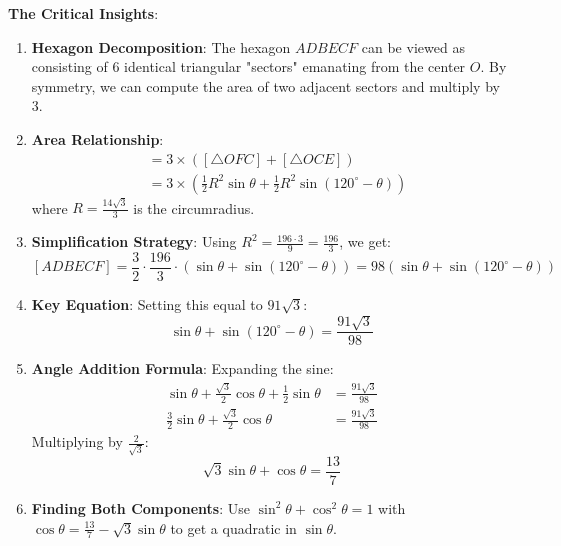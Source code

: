 \documentclass[12pt]{article}
\begin{document}
\begin{keyinsightbox}
\textbf{The Critical Insights}:

\begin{enumerate}
    \item \textbf{Hexagon Decomposition}: The hexagon $ADBECF$ can be viewed as consisting of 6 identical triangular "sectors" emanating from the center $O$. By symmetry, we can compute the area of two adjacent sectors and multiply by 3.
    
    \item \textbf{Area Relationship}: 
    \begin{align*}
        [ADBECF] &= 3 \times ([\triangle OFC] + [\triangle OCE]) \\
        &= 3 \times \left(\frac{1}{2}R^2\sin\theta + \frac{1}{2}R^2\sin(120^{\circ} - \theta)\right)
    \end{align*}
    where $R = \frac{14\sqrt{3}}{3}$ is the circumradius.
    
    \item \textbf{Simplification Strategy}: Using $R^2 = \frac{196 \cdot 3}{9} = \frac{196}{3}$, we get:
    $$[ADBECF] = \frac{3}{2} \cdot \frac{196}{3} \cdot (\sin\theta + \sin(120^{\circ} - \theta)) = 98(\sin\theta + \sin(120^{\circ} - \theta))$$
    
    \item \textbf{Key Equation}: Setting this equal to $91\sqrt{3}$:
    $$\sin\theta + \sin(120^{\circ} - \theta) = \frac{91\sqrt{3}}{98}$$
    
    \item \textbf{Angle Addition Formula}: Expanding the sine:
    \begin{align*}
        \sin\theta + \frac{\sqrt{3}}{2}\cos\theta + \frac{1}{2}\sin\theta &= \frac{91\sqrt{3}}{98} \\
        \frac{3}{2}\sin\theta + \frac{\sqrt{3}}{2}\cos\theta &= \frac{91\sqrt{3}}{98}
    \end{align*}
    Multiplying by $\frac{2}{\sqrt{3}}$:
    $$\sqrt{3}\sin\theta + \cos\theta = \frac{13}{7}$$
    
    \item \textbf{Finding Both Components}: Use $\sin^2\theta + \cos^2\theta = 1$ with $\cos\theta = \frac{13}{7} - \sqrt{3}\sin\theta$ to get a quadratic in $\sin\theta$.
\end{enumerate}
\end{keyinsightbox}
\end{document}
